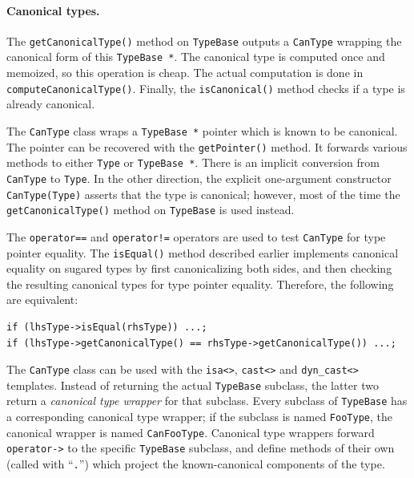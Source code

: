 \documentclass[../generics]{subfiles}
\begin{document}
\paragraph{Canonical types.}
The \texttt{getCanonicalType()} method on \texttt{TypeBase} outputs a \texttt{CanType} wrapping the canonical form of this \texttt{TypeBase *}. The canonical type is computed once and memoized, so this operation is cheap. The actual computation is done in \texttt{computeCanonicalType()}. Finally, the \texttt{isCanonical()} method checks if a type is already canonical.

The \texttt{CanType} class wraps a \texttt{TypeBase *} pointer which is known to be canonical. The pointer can be recovered with the \texttt{getPointer()} method. It forwards various methods to either \texttt{Type} or \texttt{TypeBase~*}. There is an implicit conversion from \texttt{CanType} to \texttt{Type}. In the other direction, the explicit one-argument constructor \texttt{CanType(Type)} asserts that the type is canonical; however, most of the time the \texttt{getCanonicalType()} method on \texttt{TypeBase} is used instead.

The \texttt{operator==} and \texttt{operator!=} operators are used to test \texttt{CanType} for type pointer equality. The \texttt{isEqual()} method described earlier implements canonical equality on sugared types by first canonicalizing both sides, and then checking the resulting canonical types for type pointer equality. Therefore, the following are equivalent:
\begin{Verbatim}
if (lhsType->isEqual(rhsType)) ...;
if (lhsType->getCanonicalType() == rhsType->getCanonicalType()) ...;
\end{Verbatim}
The \texttt{CanType} class can be used with the \verb|isa<>|, \verb|cast<>| and \verb|dyn_cast<>| templates. Instead of returning the actual \texttt{TypeBase} subclass, the latter two return a \emph{canonical type wrapper} for that subclass. Every subclass of \texttt{TypeBase} has a corresponding canonical type wrapper; if the subclass is named \texttt{FooType}, the canonical wrapper is named \texttt{CanFooType}. Canonical type wrappers forward \texttt{operator->} to the specific \texttt{TypeBase} subclass, and define methods of their own (called with ``\texttt{.}'') which project the known-canonical components of the type.
\end{document}
